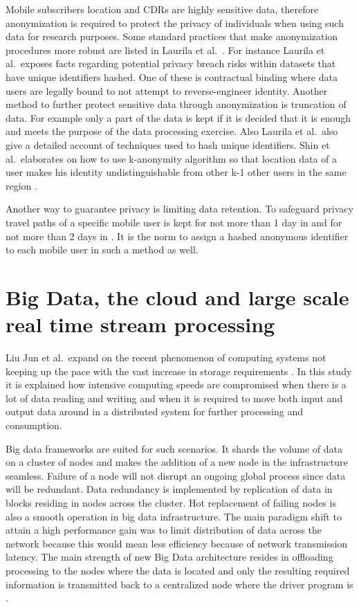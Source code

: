\documentclass[12pt, a4paper]{report}
\theoremstyle{definition}
\theoremstyle{definition}%
\theoremstyle{definition}%
\theoremstyle{definition}%
\theoremstyle{definition}%
\theoremstyle{definition}%
\begin{document}
Mobile subscribers location and CDRs are highly sensitive data, therefore anonymization is required to protect the privacy of individuals when using such data for research purposes. Some standard practices that make anonymization procedures more robust are listed in Laurila et al.\ \cite{Laurila2012}. For instance Laurila et al.\ exposes facts regarding potential privacy breach risks within datasets that have unique identifiers hashed.  One of these is contractual binding where data users are legally bound to not attempt to reverse-engineer identity. Another method to further protect sensitive data through anonymization is truncation of data. For example only a part of the data is kept if it is decided that it is enough and meets the purpose of the data processing exercise. Also Laurila et al.\ also give a detailed account of techniques used to hash unique identifiers. Shin et al.\ elaborates on how to use k-anonymity algorithm so that location data of a user makes his identity undistinguishable from other k-1 other users in the same region \cite{Shin}.

Another way to guarantee privacy is limiting data retention. To safeguard privacy travel paths of a specific mobile user is kept for not more than 1 day in \cite{Hoteit2014} and for not more than 2 days in \cite{Calabrese2013}. It is the norm to assign a hashed anonymous identifier to each mobile user in such a method as well.


\section{Big Data, the cloud and large scale real time stream processing} \label{background_big_data}

Liu Jun et al.\ expand on the recent phenomenon of computing systems not keeping up the pace with the vast increase in storage requirements \cite{Liu2014}. In this study it is explained how intensive computing speeds are compromised when there is a lot of data reading and writing and when it is required to move both input and output data around in a distributed system for further processing and consumption. 

Big data frameworks are suited for such scenarios. It shards the volume of data on a cluster of nodes and makes the addition of a new node in the infrastructure seamless. Failure of a node will not disrupt an ongoing global process since data will be redundant. Data redundancy is implemented by replication of data in blocks residing in nodes across the cluster. Hot replacement of failing nodes is also a smooth operation in big data infrastructure. The main paradigm shift to attain a high performance gain was to limit distribution of data across the network because this would mean less efficiency because of network transmission latency. The main strength of new Big Data architecture resides in offloading processing to the nodes where the data is located and only the resulting required information is transmitted back to a centralized node where the driver program is \cite{inoubli2016experimental}.
\end{document}
